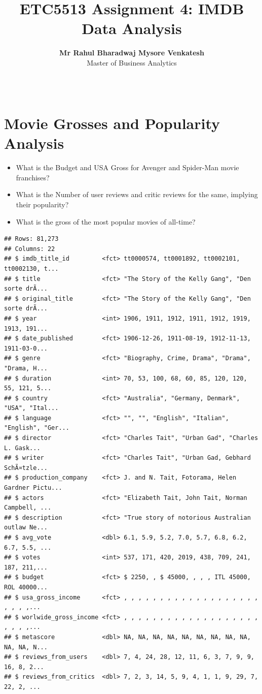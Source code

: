 \documentclass[11pt,a4paper,]{article}
\title{ETC5513 Assignment 4: IMDB Data Analysis}
\author{\sf\Large\textbf{Mr Rahul Bharadwaj Mysore Venkatesh}\\ {\sf\large Master of Business Analytics\\[0.5cm]}}
\date{\sf\Date~\Month~\Year}
\makeatletter
\def\titlepage{\front{\expandafter{\@title}}{\@author}{\@organization}}
\makeatother
\begin{document}
\titlepage

\hypertarget{movie-grosses-and-popularity-analysis}{%
\section{Movie Grosses and Popularity Analysis}\label{movie-grosses-and-popularity-analysis}}

\begin{itemize}
\item
  What is the Budget and USA Gross for Avenger and Spider-Man movie franchises?
\item
  What is the Number of user reviews and critic reviews for the same, implying their popularity?
\item
  What is the gross of the most popular movies of all-time?
\end{itemize}

\begin{verbatim}
## Rows: 81,273
## Columns: 22
## $ imdb_title_id         <fct> tt0000574, tt0001892, tt0002101, tt0002130, t...
## $ title                 <fct> "The Story of the Kelly Gang", "Den sorte drÃ...
## $ original_title        <fct> "The Story of the Kelly Gang", "Den sorte drÃ...
## $ year                  <int> 1906, 1911, 1912, 1911, 1912, 1919, 1913, 191...
## $ date_published        <fct> 1906-12-26, 1911-08-19, 1912-11-13, 1911-03-0...
## $ genre                 <fct> "Biography, Crime, Drama", "Drama", "Drama, H...
## $ duration              <int> 70, 53, 100, 68, 60, 85, 120, 120, 55, 121, 5...
## $ country               <fct> "Australia", "Germany, Denmark", "USA", "Ital...
## $ language              <fct> "", "", "English", "Italian", "English", "Ger...
## $ director              <fct> "Charles Tait", "Urban Gad", "Charles L. Gask...
## $ writer                <fct> "Charles Tait", "Urban Gad, Gebhard SchÃ¤tzle...
## $ production_company    <fct> J. and N. Tait, Fotorama, Helen Gardner Pictu...
## $ actors                <fct> "Elizabeth Tait, John Tait, Norman Campbell, ...
## $ description           <fct> "True story of notorious Australian outlaw Ne...
## $ avg_vote              <dbl> 6.1, 5.9, 5.2, 7.0, 5.7, 6.8, 6.2, 6.7, 5.5, ...
## $ votes                 <int> 537, 171, 420, 2019, 438, 709, 241, 187, 211,...
## $ budget                <fct> $ 2250, , $ 45000, , , , ITL 45000, ROL 40000...
## $ usa_gross_income      <fct> , , , , , , , , , , , , , , , , , , , , , , ,...
## $ worlwide_gross_income <fct> , , , , , , , , , , , , , , , , , , , , , , ,...
## $ metascore             <dbl> NA, NA, NA, NA, NA, NA, NA, NA, NA, NA, NA, N...
## $ reviews_from_users    <dbl> 7, 4, 24, 28, 12, 11, 6, 3, 7, 9, 9, 16, 8, 2...
## $ reviews_from_critics  <dbl> 7, 2, 3, 14, 5, 9, 4, 1, 1, 9, 29, 7, 22, 2, ...
\end{verbatim}
\end{document}
